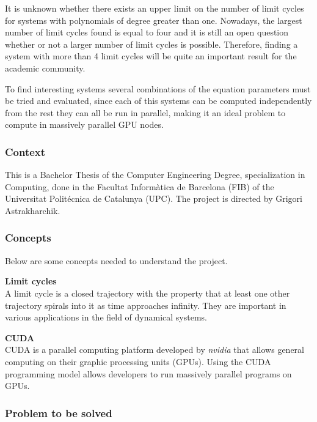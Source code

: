 \pagebreak
It is unknown whether there exists an upper limit on the number of limit cycles
for systems with polynomials of degree greater than
one\cite{ilyashenko_centennial_2002,llibre_16hilbert_nodate}.  Nowadays, the
largest number of limit cycles found is equal to four and it is still an open
question whether or not a larger number of limit cycles is possible. Therefore,
finding a system with more than 4 limit cycles will be quite an important result
for the academic community.

To find interesting systems several combinations of the equation parameters
must be tried and evaluated, since each of this systems can be computed
independently from the rest they can all be run in parallel, making it an ideal
problem to compute in massively parallel GPU nodes.

\subsubsection{Context}

This is a Bachelor Thesis of the Computer Engineering Degree, specialization in
Computing, done in the Facultat Inform\`atica de Barcelona (FIB) of the
Universitat Polit\'ecnica de Catalunya (UPC). The project is directed by Grigori
Astrakharchik.

\subsubsection{Concepts}

Below are some concepts needed to understand the project.

\newcommand{\concept}[1]{\textbf{#1}\\}

\concept{Limit cycles}
A limit cycle is a closed trajectory with the property that at least one other
trajectory spirals into it as time approaches infinity. They are important in
various applications in the field of dynamical systems.

\concept{CUDA}
CUDA is a parallel computing platform developed by \emph{nvidia} that allows general
computing on their graphic processing units (GPUs). Using the CUDA programming
model allows developers to run massively parallel programs on GPUs.

\pagebreak
\subsubsection{Problem to be solved}

